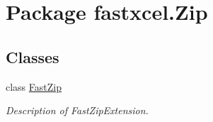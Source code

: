 \hypertarget{namespacefastxcel_1_1_zip}{
\section{Package fastxcel.Zip}
\label{namespacefastxcel_1_1_zip}
}
\subsection*{Classes}
\begin{DoxyCompactItemize}
\item 
class \hyperlink{classfastxcel_1_1_zip_1_1_fast_zip}{FastZip}
\begin{DoxyCompactList}\small\item\em Description of FastZipExtension. \item\end{DoxyCompactList}\end{DoxyCompactItemize}
